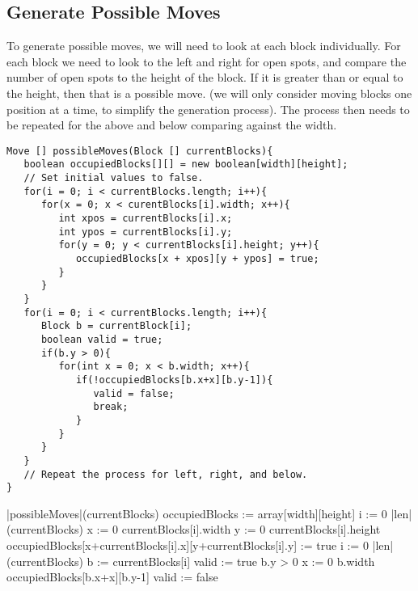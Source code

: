 \documentclass[a4paper]{article}
\begin{document}
\subsection{Generate Possible Moves}
To generate possible moves, we will need to look at each block individually. 
For each block we need to look to the left and right for open spots, and 
compare the number of open spots to the height of the block. If it is greater 
than or equal to the height, then that is a possible move. (we will only 
consider moving blocks one position at a time, to simplify the generation 
process). The process then needs to be repeated for the above and below 
comparing against the width. 
\begin{lstlisting}[caption=Generate Possible Moves]
Move [] possibleMoves(Block [] currentBlocks){
   boolean occupiedBlocks[][] = new boolean[width][height];
   // Set initial values to false.
   for(i = 0; i < currentBlocks.length; i++){
      for(x = 0; x < curentBlocks[i].width; x++){
         int xpos = currentBlocks[i].x;
         int ypos = currentBlocks[i].y;
         for(y = 0; y < currentBlocks[i].height; y++){
            occupiedBlocks[x + xpos][y + ypos] = true;
         }
      }
   }
   for(i = 0; i < currentBlocks.length; i++){
      Block b = currentBlock[i];
      boolean valid = true;
      if(b.y > 0){
         for(int x = 0; x < b.width; x++){
            if(!occupiedBlocks[b.x+x][b.y-1]){
               valid = false;
               break;
            }
         }
      }
   }
   // Repeat the process for left, right, and below. 
}
\end{lstlisting}
\begin{program}
\PROC |possibleMoves|(currentBlocks) \BODY
   occupiedBlocks := array[width][height]
   \FOR i := 0 \TO |len|(currentBlocks) \DO
      \FOR x := 0 \TO currentBlocks[i].width \DO
         \FOR y := 0 \TO currentBlocks[i].height \DO
            occupiedBlocks[x+currentBlocks[i].x][y+currentBlocks[i].y] := true
         \OD
      \OD
   \OD
   \FOR i := 0 \TO |len|(currentBlocks) \DO
      b := currentBlocks[i]
      valid := true 
      \IF b.y > 0 \THEN {}
         \FOR x := 0 \TO b.width \DO 
            \IF \NOT occupiedBlocks[b.x+x][b.y-1] \THEN 
               valid := false
               \EXIT
            \FI
         \OD
      \FI
   \OD\ENDPROC
\end{program}
\end{document}
